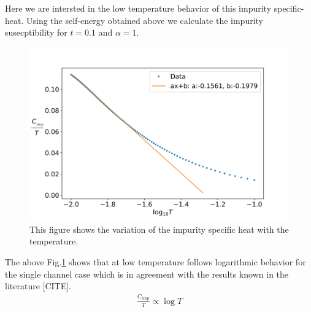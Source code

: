 \documentclass[reprint,prb,superscriptaddress]{revtex4-1}
\begin{document}
Here we are intersted in the low temperature behavior of this impurity specific-heat. Using the self-energy obtained above we calculate the impurity susecptibility for $t=0.1$ and $\alpha=1$. 
\begin{figure}
\centering
\includegraphics[scale=0.36]{plt/FINAL_fitted_Cv_t_0p1.png}
\caption{This figure shows the variation of the impurity specific heat with the temperature.}
\label{fig:Cv_imp}
\end{figure}
The above Fig.\ref{fig:Cv_imp} shows that at low temperature follows logarithmic behavior for the single channel case which is in agreement with the results known in the literature [CITE].
\begin{eqnarray}
\frac{C_{imp}}{T} \propto \log T
\end{eqnarray}
\end{document}
